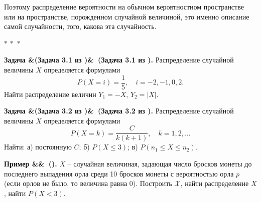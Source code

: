 \documentclass[a4paper,12pt]{article}
\renewcommand{\le}{\leqslant}
\newcommand{\threestars}{\begin{center}$ {\ast}\,{\ast}\,{\ast} $\end{center}}
\newcounter{th-counter}
\newcommand{\ex}[1][]{%
  \par\noindent\textbf{Пример%
    \ifx&#1&\else\ (#1)\fi. }%
}
\newcommand{\task}[1][]{%
  \par\noindent\textbf{Задача%
    \ifx&#1&\else\ #1\fi. }%
}
\begin{document}
Поэтому распределение вероятности на обычном вероятностном пространстве или на пространстве, порожденном случайной величиной, это именно описание самой случайности, того, какова эта случайность.

\threestars

\task[(Задача 3.1 из \cite{ZubkovSevostyanovChistyakov1989})] Распределение случайной величины $X$ определяется формулами
\[
P(X=i) = \frac{1}{5}, \quad i = -2,-1,0,2.
\]
Найти распределение величин $Y_1 = -X$, $Y_2 = |X|$.

\task[(Задача 3.2 из \cite{ZubkovSevostyanovChistyakov1989})] Распределение случайной величины $X$ определяется формулами
\[
P(X=k) = \frac{C}{k(k+1)}, \quad k = 1,2, \ldots
\]
Найти: а) постоянную $C$; б) $P(X \le 3)$; в) $P(n_1 \le X \le n_2)$.

\ex $X$ -- случайная величиная, задающая число бросков монеты до последнего выпадения орла среди 10 бросков монеты с вероятностью орла $p$ (если орлов не было, то величина равна 0). Построить $\mathcal{X}$, найти распределение $X$, найти $P(X<3)$.
\end{document}
